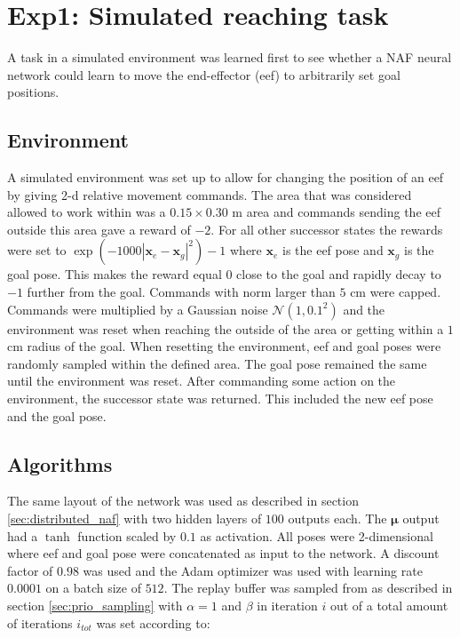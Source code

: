 \section{Exp1: Simulated reaching task}

A task in a simulated environment was learned first to see whether a NAF neural
network could learn to move the end-effector (eef) to arbitrarily set goal positions.
\subsection{Environment}

A simulated environment was set up to allow for changing the position of an eef
by giving 2-d relative movement commands. The area that was considered allowed
to work within was a $0.15 \times 0.30$ m area and commands sending the eef
outside this area gave a reward of $-2$. For all other successor states the
rewards were set to $\exp\left(-1000|\mathbf{x}_e - \mathbf{x}_g|^2\right) - 1$
where $\mathbf{x}_e$ is the eef pose and $\mathbf{x}_g$ is the goal pose. This
makes the reward equal $0$ close to the goal and rapidly decay to $-1$ further
from the goal. Commands with norm larger than $5$ cm were capped. Commands were
multiplied by a Gaussian noise $\mathcal{N}(1, 0.1^2)$ and the environment was
reset when reaching the outside of the area or getting within a $1$ cm radius
of the goal. When resetting the environment, eef and goal poses were randomly
sampled within the defined area. The goal pose remained the same until the
environment was reset. After commanding some action on the environment, the
successor state was returned. This included the new eef pose and the goal pose.

\subsection{Algorithms}

The same layout of the network was used as described in section
\ref{sec:distributed_naf} with two hidden layers of $100$ outputs each. The
$\mathbf{\mu}$ output had a $\tanh$ function scaled by $0.1$ as activation. All
poses were 2-dimensional where eef and goal pose were concatenated as input to
the network. A discount factor of $0.98$ was used and the Adam optimizer
\cite{kingma2014adam} was used with learning rate $0.0001$ on a batch size of
$512$. The replay buffer was sampled from as described in section
\ref{sec:prio_sampling} with $\alpha = 1$ and $\beta$ in iteration $i$ out of a
total amount of iterations $i_{tot}$ was set according to:

